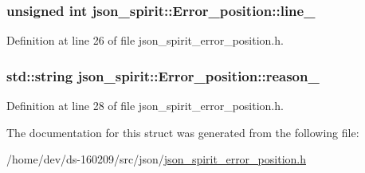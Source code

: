 \hypertarget{structjson__spirit_1_1_error__position_abab231b427a34db24a70da8b552e57f1}{}
\subsubsection[{line\+\_\+}]{\setlength{\rightskip}{0pt plus 5cm}unsigned int json\+\_\+spirit\+::\+Error\+\_\+position\+::line\+\_\+}\label{structjson__spirit_1_1_error__position_abab231b427a34db24a70da8b552e57f1}


Definition at line 26 of file json\+\_\+spirit\+\_\+error\+\_\+position.\+h.

\hypertarget{structjson__spirit_1_1_error__position_a3012abfa6a31d6fe57a3699093361fc2}{}
\subsubsection[{reason\+\_\+}]{\setlength{\rightskip}{0pt plus 5cm}std\+::string json\+\_\+spirit\+::\+Error\+\_\+position\+::reason\+\_\+}\label{structjson__spirit_1_1_error__position_a3012abfa6a31d6fe57a3699093361fc2}


Definition at line 28 of file json\+\_\+spirit\+\_\+error\+\_\+position.\+h.



The documentation for this struct was generated from the following file\+:\begin{DoxyCompactItemize}
\item 
/home/dev/ds-\/160209/src/json/\hyperlink{json__spirit__error__position_8h}{json\+\_\+spirit\+\_\+error\+\_\+position.\+h}\end{DoxyCompactItemize}
